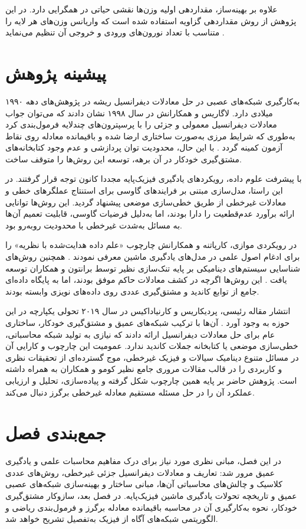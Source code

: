 علاوه بر بهینه‌ساز، مقداردهی اولیه وزن‌ها نقشی حیاتی در همگرایی دارد. در این پژوهش از روش مقداردهی گزاویه استفاده شده است که واریانس وزن‌های هر لایه را متناسب با تعداد نورون‌های ورودی و خروجی آن تنظیم می‌نماید \cite{glorot2010}.

\section{پیشینه پژوهش}
\label{sec:related}

به‌کارگیری شبکه‌های عصبی در حل معادلات دیفرانسیل ریشه در پژوهش‌های دهه ۱۹۹۰ میلادی دارد. لاگاریس و همکارانش در سال ۱۹۹۸ نشان دادند که می‌توان جواب معادلات دیفرانسیل معمولی و جزئی را با پرسپترون‌های چندلایه فرمول‌بندی کرد به‌طوری که شرایط مرزی به‌صورت ساختاری ارضا شده و باقیمانده معادله روی نقاط آزمون کمینه گردد \cite{lagaris1998}. با این حال، محدودیت توان پردازشی و عدم وجود کتابخانه‌های مشتق‌گیری خودکار در آن برهه، توسعه این روش‌ها را متوقف ساخت.

با پیشرفت علوم داده، رویکردهای یادگیری فیزیک‌پایه مجددا کانون توجه قرار گرفتند. در این راستا، مدل‌سازی مبتنی بر فرایندهای گاوسی برای استنتاج عملگرهای خطی \cite{raissi2017a} و معادلات غیرخطی از طریق خطی‌سازی موضعی \cite{raissi2018} پیشنهاد گردید. این روش‌ها توانایی ارائه برآورد عدم‌قطعیت را دارا بودند، اما به‌دلیل فرضیات گاوسی، قابلیت تعمیم آن‌ها به مسائل به‌شدت غیرخطی با محدودیت روبه‌رو بود.

در رویکردی موازی، کارپاتنه و همکارانش چارچوب «علم داده هدایت‌شده با نظریه» را برای ادغام اصول علمی در مدل‌های یادگیری ماشین معرفی نمودند \cite{karpatne2017}. همچنین روش‌های شناسایی سیستم‌های دینامیکی بر پایه تنک‌سازی نظیر  توسط برانتون و همکاران توسعه یافت \cite{sindy2016}. این روش‌ها اگرچه در کشف معادلات حاکم موفق بودند، اما به پایگاه داده‌ای جامع از توابع کاندید و مشتق‌گیری عددی روی داده‌های نویزی وابسته بودند.

انتشار مقاله رئیسی، پردیکاریس و کارنیاداکیس در سال ۲۰۱۹ تحولی یکپارچه در این حوزه به وجود آورد \cite{raissi2019}. آن‌ها با ترکیب شبکه‌های عمیق و مشتق‌گیری خودکار، ساختاری عام برای حل معادلات دیفرانسیل ارائه دادند که نیازی به تولید شبکه محاسباتی، خطی‌سازی موضعی یا کتابخانه جملات کاندید ندارد. عمومیت این چارچوب و کارایی آن در مسائل متنوع دینامیک سیالات و فیزیک غیرخطی، موج گسترده‌ای از تحقیقات نظری و کاربردی را در قالب مقالات مروری جامع نظیر کومو و همکاران \cite{cuomo2022} به همراه داشته است. پژوهش حاضر بر پایه همین چارچوب شکل گرفته و پیاده‌سازی، تحلیل و ارزیابی عملکرد آن را در حل مسئله مستقیم معادله غیرخطی برگرز دنبال می‌کند.

\section{جمع‌بندی فصل}
\label{sec:ch2-summary}

در این فصل، مبانی نظری مورد نیاز برای درک مفاهیم محاسبات علمی و یادگیری عمیق مرور شد: تعاریف و معادلات دیفرانسیل جزئی غیرخطی، روش‌های عددی کلاسیک و چالش‌های محاسباتی آن‌ها، مبانی ساختار و بهینه‌سازی شبکه‌های عصبی عمیق و تاریخچه تحولات یادگیری ماشین فیزیک‌پایه. در فصل بعد، سازوکار مشتق‌گیری خودکار، نحوه به‌کارگیری آن در محاسبه باقیمانده معادله برگرز و فرمول‌بندی ریاضی و الگوریتمی شبکه‌های آگاه از فیزیک به‌تفصیل تشریح خواهد شد.

